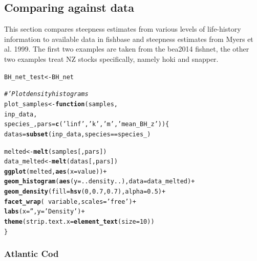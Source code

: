 \documentclass{dragonfly-report}\usepackage[]{graphicx}\usepackage[]{color}
\makeatletter
\newcommand{\hlnum}[1]{\textcolor[rgb]{0.686,0.059,0.569}{#1}}%
\newcommand{\hlstr}[1]{\textcolor[rgb]{0.192,0.494,0.8}{#1}}%
\newcommand{\hlcom}[1]{\textcolor[rgb]{0.678,0.584,0.686}{\textit{#1}}}%
\newcommand{\hlopt}[1]{\textcolor[rgb]{0,0,0}{#1}}%
\newcommand{\hlstd}[1]{\textcolor[rgb]{0.345,0.345,0.345}{#1}}%
\newcommand{\hlkwa}[1]{\textcolor[rgb]{0.161,0.373,0.58}{\textbf{#1}}}%
\newcommand{\hlkwb}[1]{\textcolor[rgb]{0.69,0.353,0.396}{#1}}%
\newcommand{\hlkwc}[1]{\textcolor[rgb]{0.333,0.667,0.333}{#1}}%
\newcommand{\hlkwd}[1]{\textcolor[rgb]{0.737,0.353,0.396}{\textbf{#1}}}%
\newenvironment{kframe}{%
 \def\at@end@of@kframe{}%
 \ifinner\ifhmode%
  \def\at@end@of@kframe{\end{minipage}}%
  \begin{minipage}{\columnwidth}%
 \fi\fi%
 \def\FrameCommand##1{\hskip\@totalleftmargin \hskip-\fboxsep
 \colorbox{shadecolor}{##1}\hskip-\fboxsep
     \hskip-\linewidth \hskip-\@totalleftmargin \hskip\columnwidth}%
 \MakeFramed {\advance\hsize-\width
   \@totalleftmargin\z@ \linewidth\hsize
   \@setminipage}}%
 {\par\unskip\endMakeFramed%
 \at@end@of@kframe}
\newenvironment{knitrout}{}{} %
\makeatother
\begin{document}
\begin{knitrout}
\end{knitrout}

\subsection{Comparing against data}

This section compares steepness estimates from various levels of life-history information to available data in fishbase and steepness estimates from Myers et al. 1999. The first two examples are taken from the bea2014 fishnet, the other two examples treat NZ stocks specifically, namely hoki and snapper.

\begin{knitrout}
\color{fgcolor}\begin{kframe}
\begin{alltt}
\hlstd{BH_net_test} \hlkwb{<-} \hlstd{BH_net}

\hlcom{#' Plot density histograms}
\hlstd{plot_samples} \hlkwb{<-} \hlkwa{function}\hlstd{(}\hlkwc{samples}\hlstd{,}
                         \hlkwc{inp_data}\hlstd{,}
                         \hlkwc{species_}\hlstd{,}\hlkwc{pars}\hlstd{=}\hlkwd{c}\hlstd{(}\hlstr{'linf'}\hlstd{,}\hlstr{'k'}\hlstd{,}\hlstr{'m'}\hlstd{,}\hlstr{'mean_BH_z'}\hlstd{))\{}
  \hlstd{datas} \hlkwb{=} \hlkwd{subset}\hlstd{(inp_data,species}\hlopt{==}\hlstd{species_)}

  \hlstd{melted} \hlkwb{<-} \hlkwd{melt}\hlstd{(samples[,pars])}
  \hlstd{data_melted} \hlkwb{<-} \hlkwd{melt}\hlstd{(datas[,pars])}
  \hlkwd{ggplot}\hlstd{(melted,}\hlkwd{aes}\hlstd{(}\hlkwc{x}\hlstd{=value))} \hlopt{+}
    \hlkwd{geom_histogram}\hlstd{(}\hlkwd{aes}\hlstd{(}\hlkwc{y} \hlstd{= ..density..),}\hlkwc{data}\hlstd{=data_melted)} \hlopt{+}
    \hlkwd{geom_density}\hlstd{(}\hlkwc{fill}\hlstd{=}\hlkwd{hsv}\hlstd{(}\hlnum{0}\hlstd{,}\hlnum{0.7}\hlstd{,}\hlnum{0.7}\hlstd{),}\hlkwc{alpha}\hlstd{=}\hlnum{0.5}\hlstd{)} \hlopt{+}
    \hlkwd{facet_wrap}\hlstd{(}\hlopt{~}\hlstd{variable,}\hlkwc{scales}\hlstd{=}\hlstr{'free'}\hlstd{)} \hlopt{+}
    \hlkwd{labs}\hlstd{(}\hlkwc{x}\hlstd{=}\hlstr{''}\hlstd{,}\hlkwc{y}\hlstd{=}\hlstr{'Density'}\hlstd{)} \hlopt{+}
    \hlkwd{theme}\hlstd{(}\hlkwc{strip.text.x}\hlstd{=}\hlkwd{element_text}\hlstd{(}\hlkwc{size}\hlstd{=}\hlnum{10}\hlstd{))}
\hlstd{\}}
\end{alltt}
\end{kframe}
\end{knitrout}

\subsubsection{Atlantic Cod}
\end{document}
